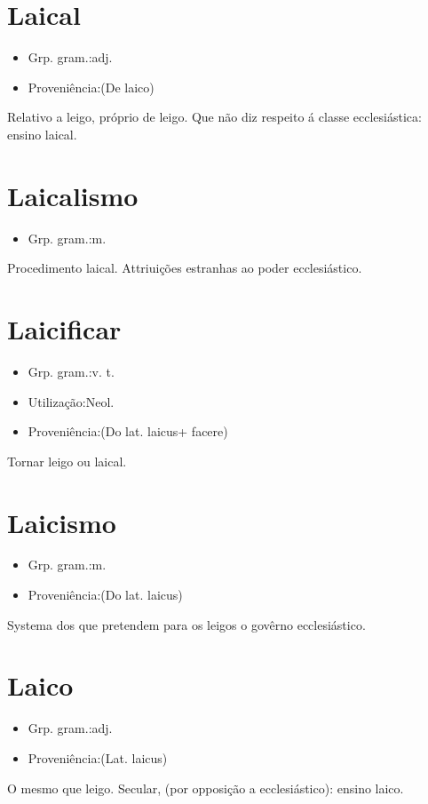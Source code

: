 \section{Laical}
\begin{itemize}
\item {Grp. gram.:adj.}
\end{itemize}
\begin{itemize}
\item {Proveniência:(De \textunderscore laico\textunderscore )}
\end{itemize}
Relativo a leigo, próprio de leigo.
Que não diz respeito á classe ecclesiástica: \textunderscore ensino laical\textunderscore .
\section{Laicalismo}
\begin{itemize}
\item {Grp. gram.:m.}
\end{itemize}
Procedimento laical.
Attriuições estranhas ao poder ecclesiástico.
\section{Laicificar}
\begin{itemize}
\item {Grp. gram.:v. t.}
\end{itemize}
\begin{itemize}
\item {Utilização:Neol.}
\end{itemize}
\begin{itemize}
\item {Proveniência:(Do lat. \textunderscore laicus\textunderscore  + \textunderscore facere\textunderscore )}
\end{itemize}
Tornar leigo ou laical.
\section{Laicismo}
\begin{itemize}
\item {Grp. gram.:m.}
\end{itemize}
\begin{itemize}
\item {Proveniência:(Do lat. \textunderscore laicus\textunderscore )}
\end{itemize}
Systema dos que pretendem para os leigos o govêrno ecclesiástico.
\section{Laico}
\begin{itemize}
\item {Grp. gram.:adj.}
\end{itemize}
\begin{itemize}
\item {Proveniência:(Lat. \textunderscore laicus\textunderscore )}
\end{itemize}
O mesmo que \textunderscore leigo\textunderscore .
Secular, (por opposição a \textunderscore ecclesiástico\textunderscore ): \textunderscore ensino laico\textunderscore .
